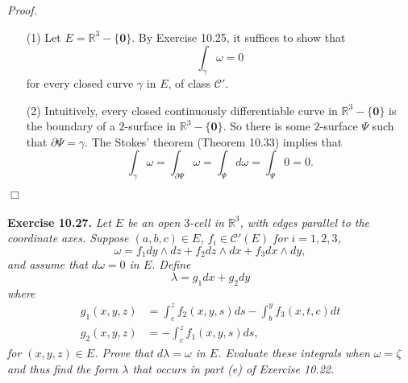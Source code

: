 \documentclass{article}
\begin{document}
\emph{Proof.}
\begin{enumerate}
\item[(1)]
  Let $E = \mathbb{R}^3 - \{\mathbf{0}\}$.
  By Exercise 10.25,
  it suffices to show that
  \[
    \int_{\gamma} \omega = 0
  \]
  for every closed curve $\gamma$ in $E$, of class $\mathscr{C}'$.

\item[(2)]
  Intuitively, every closed continuously differentiable curve in $\mathbb{R}^3 - \{\mathbf{0}\}$
  is the boundary of a $2$-surface in $\mathbb{R}^3 - \{\mathbf{0}\}$.
  So there is some $2$-surface $\Psi$ such that $\partial \Psi = \gamma$.
  The Stokes' theorem (Theorem 10.33) implies that
  \[
    \int_{\gamma} \omega
    = \int_{\partial \Psi} \omega
    = \int_{\Psi} d\omega
    = \int_{\Psi} 0
    = 0.
  \]
\end{enumerate}
$\Box$ \\\\









\textbf{Exercise 10.27.}
\emph{Let $E$ be an open $3$-cell in $\mathbb{R}^3$,
with edges parallel to the coordinate axes.
Suppose $(a,b,c) \in E$, $f_i \in \mathscr{C}'(E)$ for $i=1,2,3$,
\[
  \omega
  = f_1 dy \wedge dz + f_2 dz \wedge dx + f_3 dx \wedge dy,
\]
and assume that $d\omega = 0$ in $E$.
Define
\[
  \lambda = g_1 dx + g_2 dy
\]
where
\begin{align*}
  g_1(x,y,z) &= \int_{c}^{z} f_2(x,y,s) ds - \int_{b}^{y} f_3(x,t,c)dt \\
  g_2(x,y,z) &= - \int_{c}^{z} f_1(x,y,s) ds,
\end{align*}
for $(x,y,z) \in E$.
Prove that $d\lambda = \omega$ in $E$.
Evaluate these integrals when $\omega = \zeta$ and thus find the form $\lambda$
that occurs in part (e) of Exercise 10.22.} \\
\end{document}
